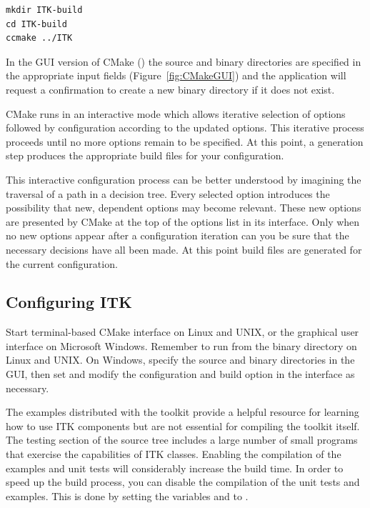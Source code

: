 \small
\begin{verbatim}
mkdir ITK-build
cd ITK-build
ccmake ../ITK
\end{verbatim}
\normalsize

In the GUI version of CMake () the source and binary directories
are specified in the appropriate input fields (Figure~\ref{fig:CMakeGUI}) and
the application will request a confirmation to create a new binary directory if
it does not exist.

CMake runs in an interactive mode which allows iterative selection of options
followed by configuration according to the updated options. This iterative
process proceeds until no more options remain to be specified. At this point, a
generation step produces the appropriate build files for your configuration.

This interactive configuration process can be better understood by imagining
the traversal of a path in a decision tree. Every selected option introduces the
possibility that new, dependent options may become relevant. These new options
are presented by CMake at the top of the options list in its interface. Only
when no new options appear after a configuration iteration can you be sure that
the necessary decisions have all been made. At this point build files are
generated for the current configuration.

\subsection{Configuring ITK}%
\label{sec:ConfigureITK}%

Start terminal-based CMake interface  on Linux and UNIX, or the
graphical user interface  on Microsoft Windows. Remember to run
 from the binary directory on Linux and UNIX. On Windows, specify
the source and binary directories in the GUI, then set and modify the
configuration and build option in the interface as necessary.

The examples distributed with the toolkit provide a helpful resource for
learning how to use ITK components but are not essential for compiling the
toolkit itself. The testing section of the source tree includes a large number
of small programs that exercise the capabilities of ITK classes. Enabling the
compilation of the examples and unit tests will considerably increase the build
time. In order to speed up the build process, you can disable the compilation of
the unit tests and examples. This is done by setting the variables
 and  to .

